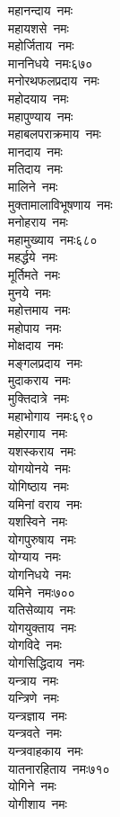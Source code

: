 \begin{multicols}{\maxColumns}
\begin{flushleft}
महानन्दाय~नमः\\
महायशसे~नमः\\
महोर्जिताय~नमः\\
माननिधये~नमः\hfill ६७०\\
मनोरथफलप्रदाय~नमः\\
महोदयाय~नमः\\
महापुण्याय~नमः\\
महाबलपराक्रमाय~नमः\\
मानदाय~नमः\\
मतिदाय~नमः\\
मालिने~नमः\\
मुक्तामालाविभूषणाय~नमः\\
मनोहराय~नमः\\
महामुख्याय~नमः\hfill ६८०\\
महर्द्धये~नमः\\
मूर्तिमते~नमः\\
मुनये~नमः\\
महोत्तमाय~नमः\\
महोपाय~नमः\\
मोक्षदाय~नमः\\
मङ्गलप्रदाय~नमः\\
मुदाकराय~नमः\\
मुक्तिदात्रे~नमः\\
महाभोगाय~नमः\hfill ६९०\\
महोरगाय~नमः\\
यशस्कराय~नमः\\
योगयोनये~नमः\\
योगिष्ठाय~नमः\\
यमिनां वराय~नमः\\
यशस्विने~नमः\\
योगपुरुषाय~नमः\\
योग्याय~नमः\\
योगनिधये~नमः\\
यमिने~नमः\hfill ७००\\
यतिसेव्याय~नमः\\
योगयुक्ताय~नमः\\
योगविदे~नमः\\
योगसिद्धिदाय~नमः\\
यन्त्राय~नमः\\
यन्त्रिणे~नमः\\
यन्त्रज्ञाय~नमः\\
यन्त्रवते~नमः\\
यन्त्रवाहकाय~नमः\\
यातनारहिताय~नमः\hfill ७१०\\
योगिने~नमः\\
योगीशाय~नमः\\

\end{flushleft}
\end{multicols}
